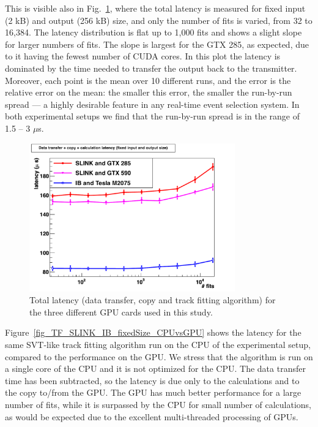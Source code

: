 \documentclass[journal]{IEEEtran}
\begin{document}
This is visible also in Fig.~\ref{fig_TF_SLINK_IB_fixedSize}, where the total 
latency is measured for fixed input (2 kB) and output (256 kB) size, and 
only the number of fits is varied, from 32 to 16,384. The latency 
distribution is flat up to 1,000 fits and shows a slight slope 
for larger numbers of fits. The slope is largest for the GTX 285, as 
expected, due to it having the fewest number of CUDA cores.
In this plot the latency is dominated by the time needed to transfer 
the output back to the transmitter.
Moreover, each point is the mean 
over 10 different runs, and the error is the relative error on the mean: 
the smaller this error, the smaller the run-by-run spread --- a highly 
desirable feature in any real-time event selection system. In both experimental
setups we find that the run-by-run spread is in the range of 1.5 -- 3 $\mu$s. 

\begin{figure}[!t]
  \centering
  \includegraphics[width=3.5in]{figures/TF_SLINK_IB_fixedSize}
  \caption{Total latency (data transfer, copy and track fitting algorithm) for the three different GPU cards used in this study.}
  \label{fig_TF_SLINK_IB_fixedSize}
\end{figure}


Figure~\ref{fig_TF_SLINK_IB_fixedSize_CPUvsGPU}
shows the latency for the same SVT-like track fitting
algorithm run on the CPU of the experimental setup, compared to the
performance on the GPU.  We stress that the algorithm is run on a
single core of the CPU and it is not optimized for the CPU.  The data
transfer time has been subtracted, so the latency is due only to the
calculations and to the copy to/from the GPU.  The GPU has much better
performance for a large number of fits, while it is surpassed by the
CPU for small number of calculations, as would be expected due to the
excellent multi-threaded processing of GPUs.
\end{document}
